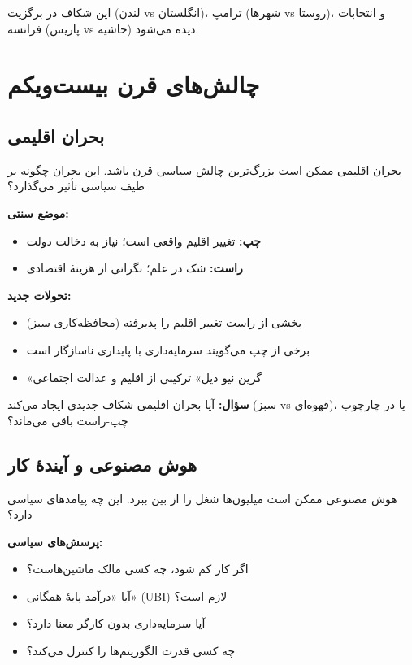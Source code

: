 این شکاف در برگزیت (لندن vs انگلستان)، ترامپ (شهرها vs روستا)، و انتخابات فرانسه (پاریس vs حاشیه) دیده می‌شود.


\section{چالش‌های قرن بیست‌ویکم}

\subsection{بحران اقلیمی}


بحران اقلیمی ممکن است بزرگ‌ترین چالش سیاسی قرن باشد. این بحران چگونه بر طیف سیاسی تأثیر می‌گذارد؟

\textbf{موضع سنتی:}
\begin{itemize}
    \item \textbf{چپ:} تغییر اقلیم واقعی است؛ نیاز به دخالت دولت
    \item \textbf{راست:} شک در علم؛ نگرانی از هزینهٔ اقتصادی
\end{itemize}

\textbf{تحولات جدید:}
\begin{itemize}
    \item بخشی از راست تغییر اقلیم را پذیرفته (محافظه‌کاری سبز)
    \item برخی از چپ می‌گویند سرمایه‌داری با پایداری ناسازگار است
    \item «گرین نیو دیل» ترکیبی از اقلیم و عدالت اجتماعی
\end{itemize}

\textbf{سؤال:} آیا بحران اقلیمی شکاف جدیدی ایجاد می‌کند (سبز vs قهوه‌ای)، یا در چارچوب چپ-راست باقی می‌ماند؟


\subsection{هوش مصنوعی و آیندهٔ کار}


هوش مصنوعی ممکن است میلیون‌ها شغل را از بین ببرد. این چه پیامدهای سیاسی دارد؟

\textbf{پرسش‌های سیاسی:}
\begin{itemize}
    \item اگر کار کم شود، چه کسی مالک ماشین‌هاست؟
    \item آیا «درآمد پایهٔ همگانی» (UBI) لازم است؟
    \item آیا سرمایه‌داری بدون کارگر معنا دارد؟
    \item چه کسی قدرت الگوریتم‌ها را کنترل می‌کند؟
\end{itemize}


